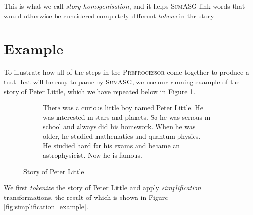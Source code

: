 This is what we call \textit{story homogenisation}, and it helps \textsc{SumASG} link words that would otherwise be considered completely different \textit{tokens} in the story.

\section{Example}
\label{sec:example}

To illustrate how all of the steps in the \textsc{Preprocessor} come together to produce a text that will be easy to parse by \textsc{SumASG}, we use our running example of the story of Peter Little, which we have repeated below in Figure \ref{fig:peter_little_story}.

\begin{figure}[H]
\begin{subfigure}{\textwidth}
\begin{displayquote}
There was a curious little boy named Peter Little. He was interested in stars and planets. So he was serious in school and always did his homework. When he was older, he studied mathematics and quantum physics. He studied hard for his exams and became an astrophysicist. Now he is famous.
\end{displayquote}
\end{subfigure}
\caption{Story of Peter Little}
\label{fig:peter_little_story}
\end{figure}

\noindent
We first \textit{tokenize} the story of Peter Little and apply \textit{simplification} transformations, the result of which is shown in Figure \ref{fig:simplification_example}.

